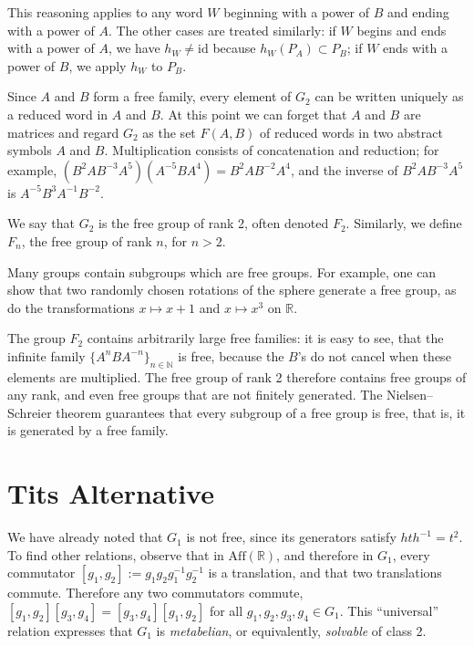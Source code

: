 \documentclass{amsart}
\begin{document}
This reasoning applies to any word $W$ beginning with a power of $B$
and ending with a power of $A$. The other cases are treated similarly:
if $W$ begins and ends with a power of $A$, we have
$h_W \neq \mathrm{id}$ because $h_W(P_A) \subset P_B$; if $W$ ends
with a power of $B$, we apply $h_W$ to $P_B$.

Since $A$ and $B$ form a free family, every element of $G_2$ can be
written uniquely as a reduced word in $A$ and $B$. At this point we
can forget that $A$ and $B$ are matrices and regard $G_2$ as the set
$F(A, B)$ of reduced words in two abstract symbols $A$ and
$B$. Multiplication consists of concatenation and reduction; for
example, $(B^2 A B^{-3} A^5)(A^{-5} B A^4) = B^2 A B^{-2} A^4$, and
the inverse of $B^2 A B^{-3} A^5$ is $A^{-5} B^3 A^{-1} B^{-2}$.

We say that $G_2$ is the free group of rank 2, often denoted
$F_2$. Similarly, we define $F_n$, the free group of rank $n$, for
$n > 2$.

Many groups contain subgroups which are free groups. For example, one
can show that two randomly chosen rotations of the sphere generate a
free group, as do the transformations $x \mapsto x + 1$ and
$x \mapsto x^3$ on $\mathbb{R}$.

The group $F_2$ contains arbitrarily large free families: it is easy
to see, that the infinite family $\{A^n B A^{-n}\}_{n \in \mathbb{N}}$ is
free, because the $B$’s do not cancel when these elements are
multiplied. The free group of rank 2 therefore contains free groups of
any rank, and even free groups that are not finitely generated. The
Nielsen–Schreier theorem guarantees that every subgroup of a free
group is free, that is, it is generated by a free family.

\section{Tits Alternative}

We have already noted that $G_1$ is not free,%
since its generators satisfy $h t h^{-1} = t^2$. To find other
relations, observe that in $\mathrm{Aff}(\mathbb{R})$, and therefore
in $G_1$, every commutator $[g_1, g_2] := g_1 g_2 g_1^{-1} g_2^{-1}$
is a translation, and that two translations commute. Therefore any two
commutators commute, $[g_1, g_2][g_3, g_4] = [g_3, g_4][g_1, g_2]$ for
all $g_1, g_2, g_3, g_4 \in G_1$. This ``universal'' relation
expresses that $G_1$ is \textit{metabelian}, or equivalently,
\textit{solvable} of class 2.
\end{document}
